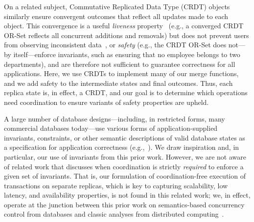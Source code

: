  On a related subject, Commutative
Replicated Data Type (CRDT) objects~\cite{crdt} similarly ensure
convergent outcomes that reflect all updates made to each object.
This convergence is a useful \textit{liveness}
property~\cite{schneider-concurrent} (e.g., a converged CRDT OR-Set
reflects all concurrent additions and removals) but does not prevent
users from observing inconsistent data~\cite{redblue-new}, or
\textit{safety} (e.g., the CRDT OR-Set does not---by itself---enforce
invariants, such as ensuring that no employee belongs to two
departments), and are therefore not sufficient to guarantee
correctness for all applications. Here, we use CRDTs to implement many
of our merge functions, and we add safety to the intermediate states
and final outcomes. Thus, each replica state is, in effect, a CRDT,
and our goal is to determine which operations need coordination to
ensure variants of safety properties are upheld.

 A large number of database
designs---including, in restricted forms, many commercial databases
today---use various forms of application-supplied invariants,
constraints, or other semantic descriptions of valid database states
as a specification for application correctness
(e.g.,~\cite{korth-serializability,kemme-si-ic,garciamolina-semantics,ic-survey,ic-survey-two,decomp-semantics,redblue,homeostasis,davidson-survey,local-verification,redblue-new,rel-serial,pwsr-pods,tamer-tods}). We
draw inspiration and, in particular, our use of invariants from this
prior work. However, we are not aware of related work that discusses
when coordination is strictly \textit{required} to enforce a given set
of invariants. That is, our formulation of coordination-free execution
of transactions on separate replicas, which is key to capturing
scalability, low latency, and availability properties, is not found in
this related work; we, in effect, operate at the junction between this
prior work on semantics-based concurrency control from databases and
classic analyses from distributed
computing~\cite{gilbert-cap}. 

